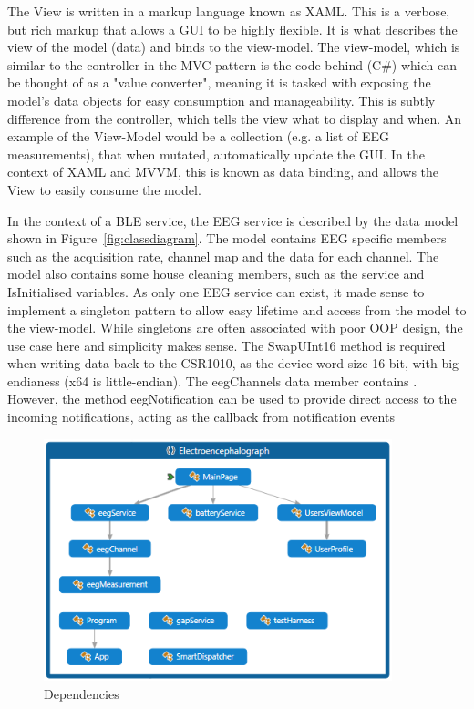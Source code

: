 \documentclass[]{article}
\begin{document}
The View is written in a markup language known as \ac{XAML}. This is a verbose, but rich markup that allows a \ac{GUI} to be highly flexible. It is what describes the view of the model (data) and binds to the view-model. The view-model, which is similar to the controller in the \ac{MVC} pattern is the code behind (C\#) which can be thought of as a "value converter", meaning it is tasked with exposing the model's data objects for easy consumption and manageability. This is subtly difference from the controller, which tells the view what to display and when. An example of the View-Model would be a collection (e.g. a list of \ac{EEG} measurements), that when mutated, automatically update the \ac{GUI}. In the context of \ac{XAML} and \ac{MVVM}, this is known as data binding, and allows the View to easily consume the model.

In the context of a \ac{BLE} service, the \ac{EEG} service is described by the data model shown in Figure~\ref{fig:classdiagram}. The model contains \ac{EEG} specific members such as the acquisition rate, channel map and the data for each channel. The model also contains some house cleaning members, such as the service and IsInitialised variables. As only one \ac{EEG} service can exist, it made sense to implement a singleton pattern to allow easy lifetime and access from the model to the view-model. While singletons are often associated with poor \ac{OOP} design, the use case here and simplicity makes sense. The SwapUInt16 method is required when writing data back to the CSR1010, as the device word size 16 bit, with big endianess (x64 is little-endian). The eegChannels data member contains . However, the method eegNotification can be used to provide direct access to the incoming notifications, acting as the callback from notification events

\begin{figure}[htb]
	\begin{center}
		\includegraphics[width = 0.9\textwidth]{dep}
	\end{center}
	\caption{Dependencies}
	\label{fig:dep}
\end{figure}
\end{document}
